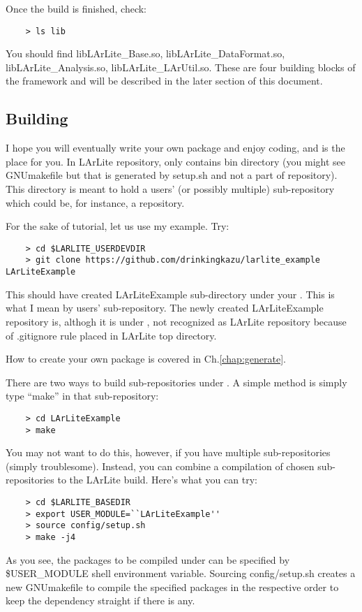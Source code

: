 Once the build is finished, check:
\begin{lstlisting}
    > ls lib
\end{lstlisting}
You should find {\ttfamily libLArLite\_Base.so, libLArLite\_DataFormat.so, libLArLite\_Analysis.so, libLArLite\_LArUtil.so}. These are four building blocks of the framework and will be described in the later section of this document.  

\subsection{Building \UserDev}

I hope you will eventually write your own package and enjoy coding, and \UserDev is the place for you.
In LArLite repository, \UserDev only contains {\ttfamily bin} directory (you might see {\ttfamily GNUmakefile} but that is generated by {\ttfamily setup.sh} and not a part of repository).
This directory \UserDev is meant to hold a users' (or possibly multiple) sub-repository which could be, for instance, a \git repository.

For the sake of tutorial, let us use my example. Try:
\begin{lstlisting}
    > cd $LARLITE_USERDEVDIR
    > git clone https://github.com/drinkingkazu/larlite_example LArLiteExample
\end{lstlisting}
This should have created {\ttfamily LArLiteExample} sub-directory under your \UserDev.
This is what I mean by users' sub-repository.
The newly created {\ttfamily LArLiteExample} repository is, althogh it is under \UserDev, not recognized as
LArLite repository because of {\ttfamily .gitignore} rule placed in LArLite top directory.

How to create your own package is covered in Ch.\ref{chap:generate}.

There are two ways to build sub-repositories under \UserDev.
A simple method is simply type ``make'' in that sub-repository:
\begin{lstlisting}
    > cd LArLiteExample
    > make
\end{lstlisting}

You may not want to do this, however, if you have multiple sub-repositories (simply troublesome).
Instead, you can combine a compilation of chosen sub-repositories to the LArLite build.
Here's what you can try:
\begin{lstlisting}
    > cd $LARLITE_BASEDIR
    > export USER_MODULE=``LArLiteExample''
    > source config/setup.sh
    > make -j4
\end{lstlisting}
As you see, the packages to be compiled under \UserDev can be specified by {\ttfamily \$USER\_MODULE} shell environment variable.  
Sourcing {\ttfamily config/setup.sh} creates a new GNUmakefile to compile the specified packages in the respective order to keep the dependency straight if there is any.


